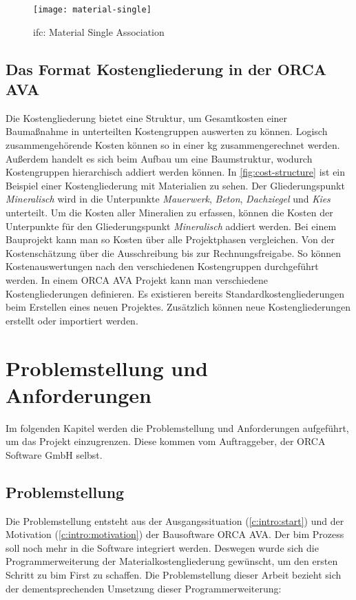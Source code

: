 \begin{figure}[h]
	\centering
	\texttt{[image: material-single]}
	\caption{\ac{ifc}: Material Single Association}
	\label{fig:material-single}
\end{figure}

\section{Das Format Kostengliederung in der ORCA AVA}
\label{c:basics:coststructure}
Die Kostengliederung bietet eine Struktur, um Gesamtkosten einer Baumaßnahme in unterteilten Kostengruppen auswerten zu können. Logisch zusammengehörende Kosten können so in einer \ac{kg} zusammengerechnet werden. Außerdem handelt es sich beim Aufbau um eine Baumstruktur, wodurch Kostengruppen hierarchisch addiert werden können. In \autoref{fig:cost-structure} ist ein Beispiel einer Kostengliederung mit Materialien zu sehen. Der Gliederungspunkt \textit{Mineralisch} wird in die Unterpunkte \textit{Mauerwerk}, \textit{Beton}, \textit{Dachziegel} und \textit{Kies} unterteilt. Um die Kosten aller Mineralien zu erfassen, können die Kosten der Unterpunkte für den Gliederungspunkt \textit{Mineralisch} addiert werden.
Bei einem Bauprojekt kann man so Kosten über alle Projektphasen vergleichen. Von der Kostenschätzung über die Ausschreibung bis zur Rechnungsfreigabe. So können Kostenauswertungen nach den verschiedenen Kostengruppen durchgeführt werden. In einem ORCA AVA Projekt kann man verschiedene Kostengliederungen definieren. Es existieren bereits Standardkostengliederungen beim Erstellen eines neuen Projektes. Zusätzlich können neue Kostengliederungen erstellt oder importiert werden.\citep[vgl.][]{helpdesk-kostengliederungen}

\chapter{Problemstellung und Anforderungen}
\label{c:requirements}
Im folgenden Kapitel werden die Problemstellung und Anforderungen aufgeführt, um das Projekt einzugrenzen. Diese kommen vom Auftraggeber, der \glqq ORCA Software GmbH\grqq{} selbst.

\section{Problemstellung}
\label{c:requirements:problem}

Die Problemstellung entsteht aus der Ausgangssituation (\autoref{c:intro:start}) und der Motivation (\autoref{c:intro:motivation}) der Bausoftware ORCA AVA. Der \ac{bim} Prozess soll noch mehr in die Software integriert werden. Deswegen wurde sich die Programmerweiterung der Materialkostengliederung gewünscht, um den ersten Schritt zu \glqq \ac{bim} First\grqq{} zu schaffen. Die Problemstellung dieser Arbeit bezieht sich der dementsprechenden Umsetzung dieser Programmerweiterung:

